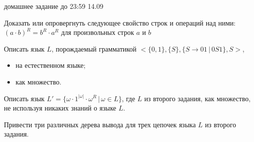 \documentclass[12pt]{article}
\begin{document}

{\Large домашнее задание до 23:59 14.09}
\bigskip

\enumerate
{
  \item 
  { Доказать или опровергнуть следующее свойство строк и операций над ними: \\ $(a \cdot b)^R = b^R \cdot a^R$ для произвольных строк $a$ и $b$
  }

  \item 
  { Описать язык $L$, порождаемый грамматикой $<\{0, 1\}, \{S\}, \{S \to 0 1 \, | \, 0 S 1\}, S>$, 
    \begin{itemize}
        \item на естественном языке;
        \item как множество.
    \end{itemize}

  }

  \item
  {
    Описать язык $L' = \{ \omega \cdot 1^{|\omega|} \cdot \omega^R \, | \, \omega \in L \}$, где $L$ из второго задания, как множество, не используя никаких знаний о языке $L$.
  }
  
  \item {Привести три различных дерева вывода для трех цепочек языка $L$ из второго задания.}
}
\end{document}
